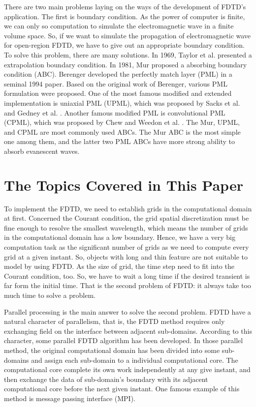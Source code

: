 There are two main problems laying on the ways of the development of FDTD's application. The first is boundary condition. As the power of computer is finite, we can only so computation to simulate the electromagnetic wave in a finite volume space. So, if we want to simulate the propagation of electromagnetic wave for open-region FDTD, we have to give out an appropriate boundary condition. To solve this problem, there are many solutions. In 1969, Taylor\cite{taylor} et al. presented a extrapolation boundary condition. In 1981, Mur\cite{mur1981absorbing} proposed a absorbing boundary condition (ABC). Berenger \cite{mur1981absorbing} developed the perfectly match layer (PML) in a seminal 1994 paper. Based on the original work of Berenger, various PML formulation were proposed. One of the most famous modified and extended implementation is uniaxial PML (UPML), which was proposed by Sacks et al. \cite{sacks} and Gedney et al. \cite{gedney}. Another famous modified PML is convolutional PML (CPML), which was proposed by Chew and Weedon et al. \cite{gedney}. The Mur, UPML, and CPML are most commonly used ABCs. The Mur ABC is the most simple one among them, and the latter two PML ABCs have more strong ability to absorb evanescent waves.

\section{The Topics Covered in This Paper}
To implement the FDTD, we need to establish grids in the computational domain at first. Concerned the Courant condition, the grid spatial discretization must be fine enough to resolve the smallest wavelength, which means the number of grids in the computational domain has a low boundary. Hence, we have a very big computation task as the significant number of grids as we need to compute every grid at a given instant. So, objects with long and thin feature are not suitable to model by using FDTD. As the size of grid, the time step need to fit into the Courant condition, too. So, we have to wait a long time if the desired transient is far form the initial time. That is the second problem of FDTD: it always take too much time to solve a problem.

Parallel processing is the main answer to solve the second problem. FDTD have a natural character of parallelism, that is, the FDTD method requires only exchanging field on the interface between adjacent sub-domains. According to this character, some parallel FDTD algorithm\cite{mpi1,mpi2,mpi3,mpi4} has been developed. In those parallel method, the original computational domain has been divided into some sub-domains and assign each sub-domain to a individual computational core. The computational core complete its own work independently at any give instant, and then exchange the data of sub-domain's boundary with its adjacent computational core before the next given instant. One famous example of this method is message passing interface (MPI).

